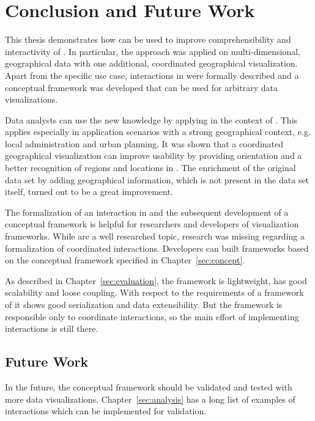 \chapter{Conclusion and Future Work}\label{sec:conclusion}

This thesis demonstrates how \cmvs{} can be used to improve comprehensibility and interactivity of \tmaps{}.
In particular, the approach was applied on multi-dimensional, geographical data with one additional, coordinated geographical visualization.
Apart from the specific use case, interactions in \cmvs{} were formally described and a conceptual framework was developed that can be used for arbitrary data visualizations.

Data analysts can use the new knowledge by applying \tmaps{} in the context of \dss{}.
This applies especially in application scenarios with a strong geographical context, e.g. local administration and urban planning.
It was shown that a coordinated geographical visualization can improve usability by providing orientation and a better recognition of regions and locations in \tmaps{}.
The enrichment of the original data set by adding geographical information, which is not present in the data set itself, turned out to be a great improvement.

The formalization of an interaction in \cmvs{} and the subsequent development of a conceptual framework is helpful for researchers and developers of visualization frameworks.
While \cmvs{} are a well researched topic, research was missing regarding a formalization of coordinated interactions.
Developers can built frameworks based on the conceptual framework specified in Chapter~\ref{sec:concept}.

As described in Chapter~\ref{sec:evaluation}, the framework is lightweight, has good scalability and loose coupling.
With respect to the requirements of a framework of \cmvs{} it shows good serialization and data extensibility.
But the framework is responsible only to coordinate interactions, so the main effort of implementing interactions is still there.

\section{Future Work}

In the future, the conceptual framework should be validated and tested with more data visualizations.
Chapter~\ref{sec:analysis} has a long list of examples of interactions which can be implemented for validation.

